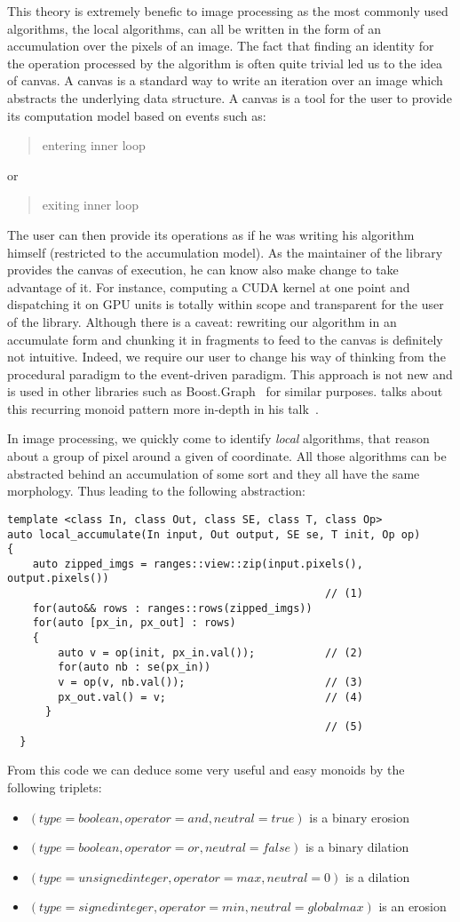 This theory is extremely benefic to image processing as the most commonly used algorithms, the local algorithms, can all
be written in the form of an accumulation over the pixels of an image. The fact that finding an identity for the
operation processed by the algorithm is often quite trivial led us to the idea of canvas. A canvas is a standard way to
write an iteration over an image which abstracts the underlying data structure. A canvas is a tool for the user to
provide its computation model based on events such as: \blockquote{entering inner loop} or \blockquote{exiting inner
  loop}. The user can then provide its operations as if he was writing his algorithm himself (restricted to the
accumulation model). As the maintainer of the library provides the canvas of execution, he can know also make change to
take advantage of it. For instance, computing a CUDA kernel at one point and dispatching it on GPU units is totally
within scope and transparent for the user of the library. Although there is a caveat: rewriting our algorithm in an
accumulate form and chunking it in fragments to feed to the canvas is definitely not intuitive. Indeed, we require our
user to change his way of thinking from the procedural paradigm to the event-driven paradigm. This approach is not new
and is used in other libraries such as Boost.Graph~\cite{siek.2001.boostgraph} for similar purposes.
\citeauthor{dean.2019.monoids} talks about this recurring monoid pattern more in-depth in his
talk~\parencite{dean.2019.monoids}.

In image processing, we quickly come to identify \emph{local} algorithms, that reason about a group of pixel around a
given of coordinate. All those algorithms can be abstracted behind an accumulation of some sort and they all have the
same morphology. Thus leading to the following abstraction:
\begin{verbatim}
template <class In, class Out, class SE, class T, class Op>
auto local_accumulate(In input, Out output, SE se, T init, Op op)
{
    auto zipped_imgs = ranges::view::zip(input.pixels(), output.pixels())
                                                  // (1)
    for(auto&& rows : ranges::rows(zipped_imgs))
    for(auto [px_in, px_out] : rows)
    {
        auto v = op(init, px_in.val());           // (2)
        for(auto nb : se(px_in))
        v = op(v, nb.val());                      // (3)
        px_out.val() = v;                         // (4)
      }
                                                  // (5)
  }
\end{verbatim}
From this code we can deduce some very useful and easy monoids by the following triplets:
\begin{itemize}
  \item $(type = boolean, operator = and, neutral = true)$ is a binary erosion
  \item $(type = boolean, operator = or, neutral = false)$ is a binary dilation
  \item $(type = unsigned integer, operator = max, neutral = 0)$ is a dilation
  \item $(type = signed integer, operator = min, neutral = global max)$ is an erosion
\end{itemize}

